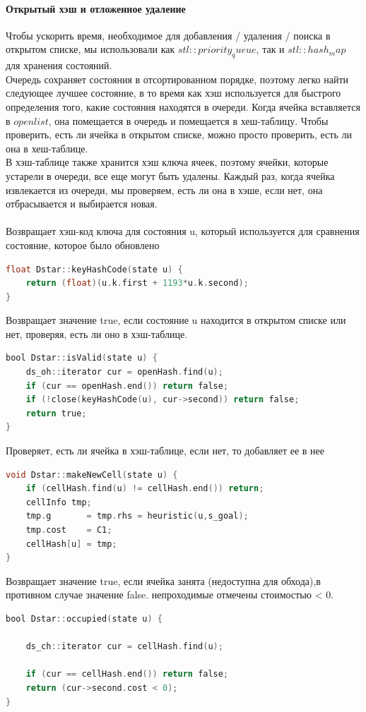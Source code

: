 \documentclass[12pt]{article}
\begin{document}
\paragraph{Открытый хэш и отложенное удаление}
Чтобы ускорить время, необходимое для добавления / удаления / поиска в открытом списке, мы использовали как $stl::priority_queue$, так и $stl ::hash_map$ для хранения состояний.\\Очередь сохраняет состояния в отсортированном порядке, поэтому легко найти следующее лучшее состояние, в то время как хэш используется для быстрого определения того, какие состояния находятся в очереди. Когда ячейка вставляется в $openlist$, она помещается в очередь и помещается в хеш-таблицу. Чтобы проверить, есть ли ячейка в открытом списке, можно просто проверить, есть ли она в хеш-таблице. \\В хэш-таблице также хранится хэш ключа ячеек, поэтому ячейки, которые устарели в очереди, все еще могут быть удалены. Каждый раз, когда ячейка извлекается из очереди, мы проверяем, есть ли она в хэше, если нет, она отбрасывается и выбирается новая.
\\
\\
Возвращает хэш-код ключа для состояния u, который используется для сравнения состояние, которое было обновлено
\begin{lstlisting}[language=C,style=C]
float Dstar::keyHashCode(state u) {
    return (float)(u.k.first + 1193*u.k.second);
}
\end{lstlisting}

Возвращает значение true, если состояние u находится в открытом списке или нет,
проверяя, есть ли оно в хэш-таблице.
\begin{lstlisting}[language=C,style=C]
bool Dstar::isValid(state u) {
    ds_oh::iterator cur = openHash.find(u);
    if (cur == openHash.end()) return false;
    if (!close(keyHashCode(u), cur->second)) return false;
    return true;
}
\end{lstlisting}

Проверяет, есть ли ячейка в хэш-таблице, если нет, то добавляет ее в нее
\begin{lstlisting}[language=C,style=C]
void Dstar::makeNewCell(state u) {
    if (cellHash.find(u) != cellHash.end()) return;
    cellInfo tmp;
    tmp.g       = tmp.rhs = heuristic(u,s_goal);
    tmp.cost    = C1;
    cellHash[u] = tmp;
}
\end{lstlisting}
\newpage
Возвращает значение true, если ячейка занята (недоступна для обхода),в противном случае значение false. непроходимые отмечены стоимостью < 0.
\begin{lstlisting}[language=C,style=C]
bool Dstar::occupied(state u) {

    ds_ch::iterator cur = cellHash.find(u);

    if (cur == cellHash.end()) return false;
    return (cur->second.cost < 0);
}
\end{lstlisting}
\end{document}
